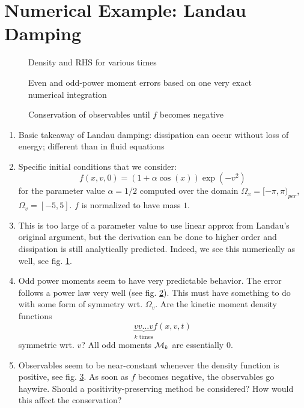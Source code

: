 
\section{Numerical Example: Landau Damping}\label{sec:landau}

\begin{figure}
    \missingfigure{}
    \caption{
        Density and RHS for various times
    }\label{fig:density}
\end{figure}

\begin{figure}
    \missingfigure{}
    \caption{
        Even and odd-power moment errors based on one very exact numerical integration
    }\label{fig:moments}
\end{figure}

\begin{figure}
    \missingfigure{}
    \caption{
        Conservation of observables until $f$ becomes negative
    }\label{fig:positivity}
\end{figure}

\begin{enumerate}
    \item Basic takeaway of Landau damping: dissipation can occur without loss of energy; 
          different than in fluid equations
    \item Specific initial conditions that we consider: 
          \begin{equation}
            f (x, v, 0) = ( 1 + \alpha \cos (x) ) \exp (- v^2)
          \end{equation}
          for the parameter value $\alpha = 1/2$ computed over the domain 
          $\Omega_x = [ -\pi, \pi )_{per}$, $\Omega_v = [ -5, 5 ]$. $f$ is normalized 
          to have mass $1$. 
    \item This is too large of a parameter value to use linear approx from Landau's 
          original argument, but the derivation can be done to higher order and 
          dissipation is still analytically predicted. Indeed, we see this numerically as 
          well, see fig. \ref{fig:density}. 
    \item Odd power moments seem to have very predictable behavior. The error follows a 
          power law very well (see fig. \ref{fig:moments}). This must have something to 
          do with some form of symmetry wrt. $\Omega_v$. Are the kinetic moment density 
          functions 
          \begin{equation}
            \underbrace{v v \ldots v}_{k\text{ times}} f(x, v, t)
          \end{equation}
          symmetric wrt. $v$? All odd moments $\mathcal{M}_k$ are essentially $0$. 
    \item Observables seem to be near-constant whenever the density function is 
          positive, see fig. \ref{fig:positivity}. As soon as $f$ becomes negative, the 
          observables go haywire. Should a positivity-preserving method be considered? 
          How would this affect the conservation? 
\end{enumerate}

